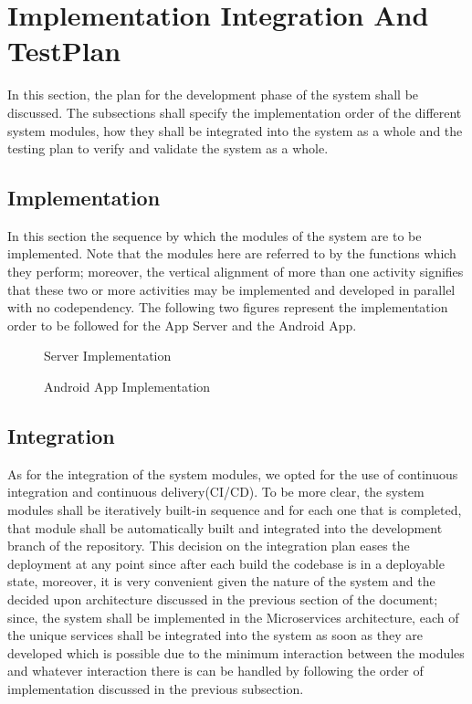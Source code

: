 \section{Implementation Integration And TestPlan}
In this section, the plan for the development phase of the system shall be discussed. The subsections shall specify the implementation order of the different system modules, how they shall be integrated into the system as a whole and the testing plan to verify and validate the system as a whole.

\subsection{Implementation}
In this section the sequence by which the modules of the system are to be implemented. Note that the modules here are referred to by the functions which they perform; moreover, the vertical alignment of more than one activity signifies that these two or more activities may be implemented and developed in parallel with no codependency. The following two figures represent the implementation order to be followed for the App Server and the Android App.

\begin{figure}[H]
\caption{Server Implementation}
\label{fig:server-imp}
\centering

\end{figure}

\begin{figure}[H]
\caption{Android App Implementation}
\label{fig:android-imp}
\centering

\end{figure}
\subsection{Integration}
As for the integration of the system modules, we opted for the use of continuous integration and continuous delivery(CI/CD). To be more clear, the system modules shall be iteratively built-in sequence and for each one that is completed, that module shall be automatically built and integrated into the development branch of the repository. This decision on the integration plan eases the deployment at any point since after each build the codebase is in a deployable state, moreover, it is very convenient given the nature of the system and the decided upon architecture discussed in the previous section of the document; since, the system shall be implemented in the Microservices architecture, each of the unique services shall be integrated into the system as soon as they are developed which is possible due to the minimum interaction between the modules and whatever interaction there is can be handled by following the order of implementation discussed in the previous subsection.

